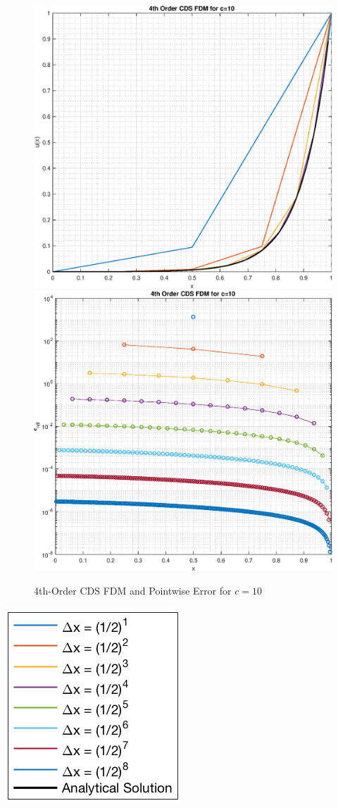 \documentclass[10pt, reqno]{article}		%
\numberwithin{equation}{section}
\begin{document}
\begin{figure}[H]
	\begin{center}
		\includegraphics[width = 0.49\linewidth]{solution_4th_order_cds_c_10}
		\includegraphics[width = 0.49\linewidth]{pointwise_error_4th_order_cds_c_10}
		\caption{4th-Order CDS FDM and Pointwise Error for $c = 10$}
	\end{center}
\end{figure}

\begin{center}
	\includegraphics[height = 0.25\linewidth]{legend}
\end{center}

\newpage
\end{document}
